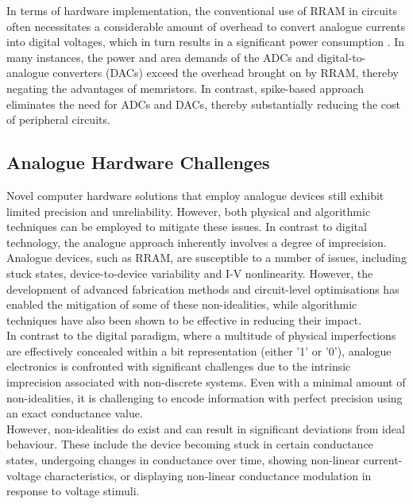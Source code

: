 \noindent In terms of hardware implementation, the conventional use of RRAM in circuits often necessitates a considerable amount of overhead to convert analogue currents into digital voltages, which in turn results in a significant power consumption \cite{cai2019fully}. In many instances, the power and area demands of the ADCs and digital-to-analogue converters (DACs) exceed the overhead brought on by RRAM, thereby negating the advantages of memristors. In contrast, spike-based approach eliminates the need for ADCs and DACs, thereby substantially reducing the cost of peripheral circuits.

\subsection[Analogue Hardware Challenges]{Analogue Hardware Challenges}

\noindent Novel computer hardware solutions that employ analogue devices still exhibit limited precision and unreliability. However, both physical and algorithmic techniques can be employed to mitigate these issues. In contrast to digital technology, the analogue approach inherently involves a degree of imprecision. \\

\noindent Analogue devices, such as RRAM, are susceptible to a number of issues, including stuck states, device-to-device variability and I-V nonlinearity. However, the development of advanced fabrication methods and circuit-level optimisations has enabled the mitigation of some of these non-idealities, while algorithmic techniques have also been shown to be effective in reducing their impact.\\

\noindent In contrast to the digital paradigm, where a multitude of physical imperfections are effectively concealed within a bit representation (either '1' or '0'), analogue electronics is confronted with significant challenges due to the intrinsic imprecision associated with non-discrete systems. Even with a minimal amount of non-idealities, it is challenging to encode information with perfect precision using an exact conductance value.\\

\noindent However, non-idealities do exist and can result in significant deviations from ideal behaviour. These include the device becoming stuck in certain conductance states, undergoing changes in conductance over time, showing non-linear current-voltage characteristics, or displaying non-linear conductance modulation in response to voltage stimuli. \\

